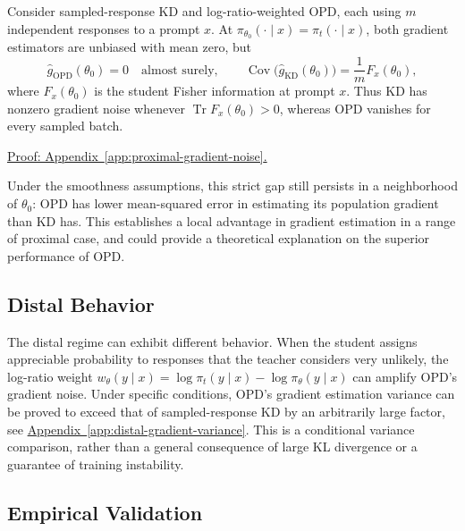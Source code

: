 \begin{lemma}
\label{lem:proximal-gradient-noise}
Consider sampled-response KD and log-ratio-weighted OPD, each using $m$
independent responses to a prompt $x$. At
$\pi_{\theta_0}(\cdot\mid x)=\pi_t(\cdot\mid x)$, both gradient
estimators are unbiased with mean zero, but
\begin{equation}
 \widehat g_{\mathrm{OPD}}(\theta_0)=0\quad\text{almost surely},
 \qquad
 \operatorname{Cov}\bigl(\widehat g_{\mathrm{KD}}(\theta_0)\bigr)
 =\frac1m F_x(\theta_0),
 \label{eq:proximal-gradient-noise}
\end{equation}
where $F_x(\theta_0)$ is the student Fisher information at prompt $x$.
Thus KD has nonzero gradient noise whenever
$\operatorname{Tr}F_x(\theta_0)>0$, whereas OPD vanishes for every sampled
batch.
\end{lemma}
\noindent\hyperref[app:proximal-gradient-noise]{Proof: Appendix~\ref*{app:proximal-gradient-noise}.}

Under the smoothness assumptions,
this strict gap still persists in a neighborhood of $\theta_0$: OPD has lower mean-squared error in
estimating its population gradient than KD has. This establishes a local advantage in gradient estimation in a range of proximal case, and could provide a theoretical explanation on the superior performance of OPD.

\subsection{Distal Behavior}

The distal regime can exhibit different behavior. When the student assigns
appreciable probability to responses that the teacher considers very
unlikely, the log-ratio weight
$w_\theta(y\mid x)=\log\pi_t(y\mid x)-\log\pi_\theta(y\mid x)$
can amplify OPD's gradient noise. Under specific conditions, OPD's gradient
estimation variance can be proved to exceed that of sampled-response KD
by an arbitrarily large factor, see
\hyperref[app:distal-gradient-variance]{Appendix~\ref*{app:distal-gradient-variance}}.
This is a conditional variance comparison, rather than a general
consequence of large KL divergence or a guarantee of training instability.

\subsection{Empirical Validation}

